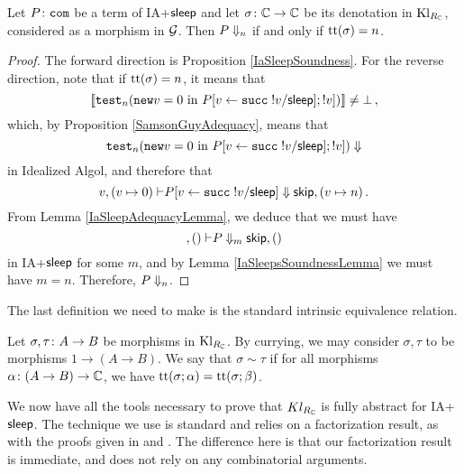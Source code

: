 \documentclass{article}
\begin{document}
\begin{theorem}
  Let $P\colon{\mathtt{com}}$ be a term of IA+${\mathsf{sleep}}$ and let $\sigma\colon \mathbb{C}\to \mathbb{C}$ be its denotation in $\operatorname{Kl}_{R_{\mathbb{C}}}$, considered as a morphism in $\mathcal G$.
  Then $P\Downarrow_n$ if and only if $\mathrm{tt}(\sigma)=n$.
  \label{IaSleepComputationalAdequacy}
\end{theorem}
\begin{proof}
  The forward direction is Proposition \ref{IaSleepSoundness}.  
  For the reverse direction, note that if $\mathrm{tt}(\sigma)=n$, it means that
  \[
    \left\llbracket{\mathtt{test}}_n({\mathtt{new}} v=0\text{ in }P[v\gets {\mathtt{succ\;}}!v/{\mathsf{sleep}}];!v])\right\rrbracket \ne \bot\,,
  \]
  which, by Proposition \ref{SamsonGuyAdequacy}, means that
  \[
    {\mathtt{test}}_n({\mathtt{new}} v=0\text{ in } P[v\gets{\mathtt{succ\;}}!v/{\mathsf{sleep}}];!v])\Downarrow
  \]
  in Idealized Algol, and therefore that
  \[
    v,(v\mapsto 0) {\;\vdash} P[v\gets{\mathtt{succ\;}}!v/{\mathsf{sleep}}]\Downarrow {\mathsf{skip}},(v\mapsto n)\,.
    \]
  From Lemma \ref{IaSleepAdequacyLemma}, we deduce that we must have
  \[
    ,() {\;\vdash} P \Downarrow_m {\mathsf{skip}},()
    \]
  in IA+${\mathsf{sleep}}$ for some $m$, and by Lemma \ref{IaSleepsSoundnessLemma} we must have $m=n$.  
  Therefore, $P\Downarrow_n$.
\end{proof}

The last definition we need to make is the standard intrinsic equivalence relation.

\begin{definition}
  Let $\sigma,\tau\colon A \to B$ be morphisms in $\operatorname{Kl}_{R_{\mathbb{C}}}$.  
  By currying, we may consider $\sigma,\tau$ to be morphisms $1 \to (A \to B)$.  
  We say that $\sigma\sim\tau$ if for all morphisms $\alpha\colon (A \to B) \to \mathbb{C}$, we have $\mathrm{tt}(\sigma;\alpha)=\mathrm{tt}(\sigma;\beta)$.
\end{definition}

We now have all the tools necessary to prove that $Kl_{R_{\mathbb{C}}}$ is fully abstract for IA+${\mathsf{sleep}}$.
The technique we use is standard and relies on a factorization result, as with the proofs given in \cite{SamsonGuyIAActive} and \cite{mcCHFiniteND}.  
The difference here is that our factorization result is immediate, and does not rely on any combinatorial arguments.
\end{document}
